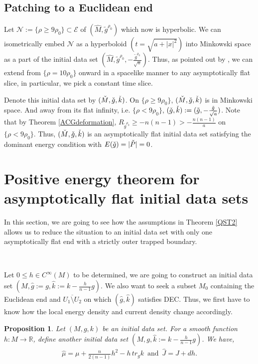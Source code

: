 \documentclass[11pt]{amsart}
\newcommand{\be}{\begin{equation}}
\newcommand{\ee}{\end{equation}}
\newtheorem{prop}{Proposition}[section]
\theoremstyle{remark}
\numberwithin{equation}{section}
\def\be{\begin{equation}}
\def\ee{\end{equation}}
\def\R{\mathbb{R}}
\def\mE{\mathcal{E}}
\def\mE{\mathcal{E}}
\def\h {\hat}
\def\mN{\mathcal{N}}
\begin{document}
{{\subsection{Patching to a Euclidean end}
Let $\mN:=\{ \rho \geq 9 \rho_0 \}\subset \mE$ of $(\hat M, \tilde g^{\rho_0})$ which now is hyperbolic. We can isometrically embed $\mN$ as a hyperboloid $\left(t= \sqrt{ a + |x|^2}\right)$ into Minkowski space as a part of the initial data set $(\hat M,\tilde g^{\rho_0},-\frac{\tilde g^{\rho_0}}{\sqrt{a}})$.  Thus, as pointed out by \cite{CD19},  we can extend from $\{ \rho= 10 \rho_0 \}$ onward in a spacelike manner to any asymptotically flat slice, in particular, we pick a constant time slice.

Denote this initial data set by $(\Check M, \Check g, \Check k)$.  On $\{ \rho \geq 9 \rho_0 \}$, $(\Check M, \Check g, \Check k)$ is in Minkowski space. And away from its flat infinity, i.e. $\{\rho< 9 \rho_0\}$, $(\Check g, \Check k):=(\tilde g,-\frac{\tilde g}{\sqrt{a}})$. Note that by Theorem \ref{ACGdeformation}, $R_{\tilde g^{\rho_0}}\geq -n(n-1)>-\frac{n(n-1)}{a}$ on $\{\rho< 9 \rho_0 \}$. Thus, $(\Check M, \Check g, \Check k)$ is an asymptotically flat initial data set satisfying the dominant energy condition with $E(\Check g)=|\Check P|=0$.  

\section{Positive energy theorem for asymptotically flat initial data sets}\label{AF}
In this section, we are going to see how the assumptions in Theorem \ref{QST2} allows us to reduce the situation to an initial data set with only one asymptotically flat end with a strictly outer trapped boundary.  

\

Let $0\leq h\in C^{\infty}(M)$ to be determined, we are going to construct an initial data set $(M, \h g:= g, \h k:=k-\frac{h}{n-1}g)$. We also want to seek a subset $M_0$ containing the Euclidean end and $\overline{U_1\setminus U_2}$ on which $(\h g, \h k)$ satisfies DEC. Thus, we first have to know how the local energy density and current density change accordingly. 


\begin{prop}\label{newDEC}
Let $(M,g,k)$ be an initial data set. For a smooth function $h:M\to \R$, define another initial data set $(M,g,\hat k:=k-\frac{h}{n-1}g)$. We have, 
\be
\begin{split}
\h \mu = \mu+\frac{n}{2(n-1)}h^2-h\, tr_g k \,\,\, \text{and} \,\,\, \h J= J+dh. 
\end{split}
\ee 
\end{prop}

}}
\end{document}
